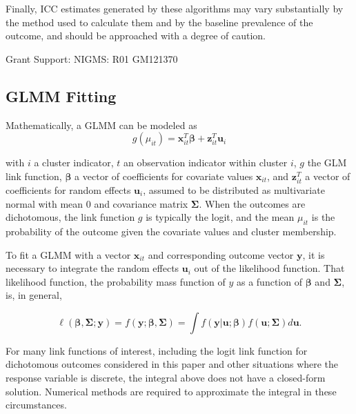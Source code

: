 \documentclass[Afour,times,sagev,doublespace]{sagej}
\begin{document}
Finally, ICC estimates generated by these algorithms may vary substantially by the method used to calculate them and by the baseline prevalence of the outcome, and should be approached with a degree of caution.







\begin{funding}
Grant Support: NIGMS: R01 GM121370
\end{funding}

\begin{sm}

\subsection{GLMM Fitting}
Mathematically, a GLMM can be modeled as
    \begin{equation}
        g(\mu_{it})=\mathbf{x}^T_{it} \boldsymbol{\beta} + \mathbf{z}^T_{it}\mathbf{u}_i
    \end{equation}
    
    with
 $i$ a cluster indicator, $t$ an observation indicator within cluster $i$, $g$ the GLM link function, $\boldsymbol{\beta}$ a vector of coefficients for covariate values $\mathbf{x}_{it}$, and $\mathbf{z}^T_{it}$ a vector of coefficients for random effects $\mathbf{u}_i$, assumed to be distributed as multivariate normal with mean $0$ and covariance matrix $\mathbf{\Sigma}$. When the outcomes are dichotomous, the link function $g$ is typically the logit, and the mean $\mu_{it}$ is the probability of the outcome given the covariate values and cluster membership.
 
To fit a GLMM with a vector $\mathbf{x}_{it}$ and corresponding outcome vector $\mathbf{y}$, it is necessary to integrate the random effects $\mathbf{u}_i$ out of the likelihood function\cite{rodriguez_assessment_1995}. That likelihood function, the probability mass function of $y$ as a function of $\boldsymbol{\beta}$ and $\mathbf{\Sigma}$\cite{agresti_categorical_2013}, is, in general,

\begin{equation}
 \ell(\boldsymbol{\beta}, \mathbf{\Sigma} ; \mathbf{y})=f(\mathbf{y};\boldsymbol{\beta}, \mathbf{\Sigma})=\int f(\mathbf{y}|\mathbf{u};\boldsymbol{\beta})f(\mathbf{u}; \mathbf{\Sigma})d\mathbf{u}.   
\end{equation}

For many link functions of interest, including the logit link function for dichotomous outcomes considered in this paper and other situations where the response variable is discrete, the integral above does not have a closed-form solution\cite{ng_estimation_2006}. Numerical methods are required to approximate the integral in these circumstances.


\end{sm}
\end{document}

